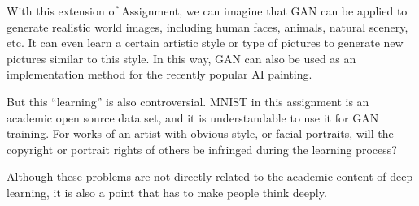 With this extension of Assignment, we can imagine that GAN can be applied to generate realistic world images, including human faces, animals, natural scenery, etc.
It can even learn a certain artistic style or type of pictures to generate new pictures similar to this style.
In this way, GAN can also be used as an implementation method for the recently popular AI painting.

But this ``learning'' is also controversial.
MNIST in this assignment is an academic open source data set, and it is understandable to use it for GAN training.
For works of an artist with obvious style, or facial portraits, will the copyright or portrait rights of others be infringed during the learning process?

Although these problems are not directly related to the academic content of deep learning, it is also a point that has to make people think deeply.
